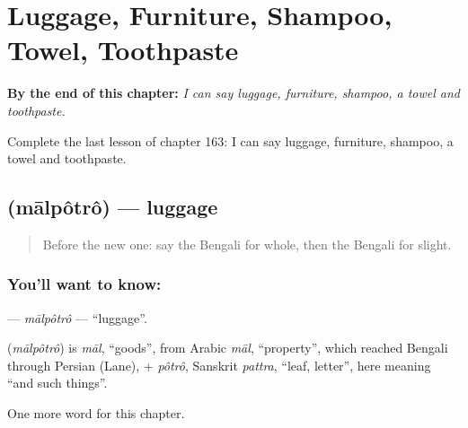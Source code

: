 
\chapter{Luggage, Furniture, Shampoo, Towel, Toothpaste}
\label{ch:bn-luggage-furniture-shampoo-towel-toothpaste}

\begin{chapteropening}
\textbf{By the end of this chapter:} \emph{I can say luggage, furniture, shampoo, a towel and toothpaste.}

Complete the last lesson of chapter 163: I can say luggage, furniture, shampoo, a towel and toothpaste.
\end{chapteropening}

\section[\texorpdfstring{\bn{মালপত্র} (mālpôtrô)}{মালপত্র (mālpôtrô)}]{ (mālpôtrô) — luggage}

\label{lesson:BN-C163-malpotro}



\begin{quote}
Before the new one: say the Bengali for whole, then the Bengali for slight.
\end{quote}

\subsection*{You'll want to know: }
\textbf{} — \emph{mālpôtrô} — \textquotedblleft{}luggage\textquotedblright{}.

\begin{cousinweb}
\textbf{} (\emph{mālpôtrô}) is \emph{māl}, \textquotedblleft{}goods\textquotedblright{}, from Arabic \emph{māl}, \textquotedblleft{}property\textquotedblright{}, which reached Bengali through Persian (Lane), + \emph{pôtrô}, Sanskrit \emph{pattra}, \textquotedblleft{}leaf, letter\textquotedblright{}, here meaning \textquotedblleft{}and such things\textquotedblright{}.
\end{cousinweb}

\begin{grammarlens}[title={What you've built}]
One more word for this chapter.
\end{grammarlens}

